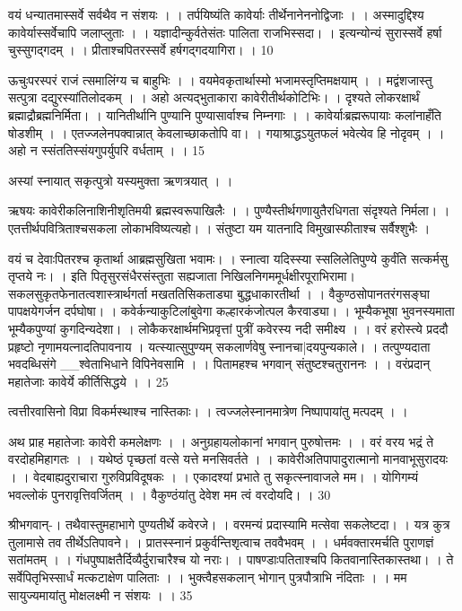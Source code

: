 वयं धन्यातमास्सर्वे सर्वथैव न संशयः ।
।
तर्पयिष्यंति कावेर्याः तीर्थेनानेननोद्विजाः ।
।
अस्मादुद्दिश्य कावेर्यास्सर्वेचापि जलाप्लुताः ।
।
यज्ञादीन्कुर्वतेसंतः पालिता राजभिस्सदा।
।
इत्यन्योन्यं सुरास्सर्वे हर्षा चुस्सुगद्गदम् ।
।
प्रीताश्चपितरस्सर्वे हर्षगद्गदयागिरा।
।
10

ऊचुःपरस्परं राजं त्समालिंग्य च बाहुभिः ।
।
वयमेवकृतार्थास्मो भजामस्तृप्तिमक्षयाम् ।
।
मद्वंशजास्तु सत्पुत्रा दद्युरस्यांतिलोदकम् ।
।
अहो अत्यद्भुताकारा कावेरीतीर्थकोटिभिः।
।
दृश्यते लोकरक्षार्थं ब्रह्माद्रौब्रह्मनिर्मिता।
।
यानितीर्थानि पुण्यानि पुण्यासार्वाश्च निम्नगाः ।
।
कावेर्याःब्रह्मरूपायाः कलांनाहँति षोडशीम् ।
।
एतज्जलेनपक्वान्नात् केवलाच्छाकतोपि वा।
।
गयाश्राद्धऽयुतफलं भवेत्येव हि नोदृवम् ।
।
अहो न स्संततिस्संयगुपर्युपरि वर्धताम् ।
।
15

अस्यां स्नायात् सकृत्पुत्रो यस्यमुक्ता ऋणत्रयात् ।
।

ऋषयः
कावेरीकलिनाशिनीशृतिमयी ब्रह्मस्वरूपाखिलैः ।
।
पुण्यैस्तीर्थगणायुतैरधिगता संदृश्यते निर्मला।
।
एतत्तीर्थपवित्रिताश्चसकला लोकाभविष्यत्यहो।
।
संतुष्टा यम यातनादि विमुखास्फीताश्च सर्वैश्शुभैः ।

वयं च देवाःपितरश्च कृतार्था आब्रह्मसुखिता भवामः।
।
स्नात्वा यदिस्स्या स्सलिलेतिपुण्ये
कुर्वंति सत्कर्मसु तृप्तये नः।
।
इति पितृसुरसंधैरसंस्तुता सह्यजाता
निखिलनिगममूर्धक्षीरपूराभिरामा।
सकलसुकृतफेनातत्वशास्त्रार्थगर्ता
मखततिसिकताड्या बुद्धधाकारतीर्था ।
।
वैकुण्ठसोपानतरंगसङ्घा पापक्षयेगर्जन दर्पघोषा।
।
कवेर्कन्याकुटिलांबुवेगा
कल्हारकंजोत्पल कैरवाड्या।
।
भूम्यैकभूषा भुवनस्यमाता
भूम्यैकपुण्यां कुगदिन्यदेशा।
।
लोकैकरक्षार्थमभिप्रवृत्तां पुत्रीं कवेरस्य नदी समीक्ष्य ।
।
वरं हरोस्त्ये प्रददौ प्रहृष्टो नृणामयत्नादतिपावनाय ।
यत्स्यात्सुपुण्यम्
सकलार्णवेषु स्नानचा|दयपुन्यकाले।
।
तत्पुण्यदाता भवदब्धिसंगे
__श्वेताभिधाने विपिनेवसामि ।
।
पितामहश्च भगवान् संतुष्टश्चतुराननः ।
।
वरंप्रदान् महातेजाः कावेर्ये कीर्तिसिद्धये ।
।
25

त्वत्तीरवासिनो विप्रा विकर्मस्थाश्च नास्तिकाः।
।
त्वज्जलेस्नानमात्रेण निष्पापायांतु मत्पदम् ।
।

अथ प्राह महातेजाः कावेरी कमलेक्षणः ।
।
अनुग्रहायलोकानां भगवान् पुरुषोत्तमः ।
।
वरं वरय भद्रं ते वरदोहमिहागतः ।
।
यथेष्ठं पृच्छतां वत्से यत्ते मनसिवर्तते ।
।
कावेरीअतिपापादुरात्मानो मानवाभूसुरादयः ।
।
वेदबाह्यदुराचारा गुरुविप्रविदूषकः ।
।
एकादश्यां प्रभाते तु सकृत्स्नावाजले मम।
।
योगिगम्यं भवल्लोकं पुनरावृत्तिवर्जितम् ।
।
वैकुण्ठंयांतु देवेश मम त्वं वरदोयदि।
।
30

श्रीभगवान्-।
तथैवास्तुमहाभागे पुण्यतीर्थे कवेरजे।
।
वरमन्यं प्रदास्यामि मत्सेवा सकलेष्टदा।
।
यत्र कुत्र तुलामासे तव तीर्थेऽतिपावने।
।
प्रातस्स्नानं प्रकुर्वन्तिशृत्वाच तववैभवम् ।
।
धर्मवक्तारमर्चति पुराणज्ञं सतांमतम् ।
।
गंधपुष्पाक्षतैर्दिव्यैर्दुराचारैश्च यो नराः।
।
पाषण्डाःपतिताश्चपि कितवानास्तिकास्तथा।
।
ते सर्वेपितृभिस्सार्धं मत्कटाक्षेण पालिताः ।
।
भुक्त्वैहसकलान् भोगान् पुत्रपौत्राभि नंदिताः ।
।
मम सायुज्यमायांतु मोक्षलक्ष्मी न संशयः ।
।
35

